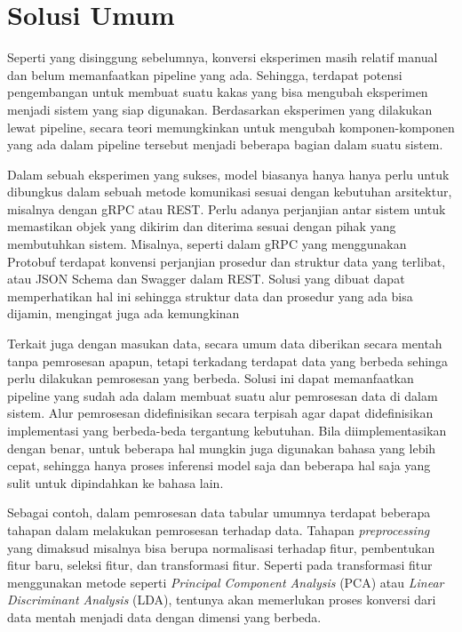 \section{Solusi Umum}

Seperti yang disinggung sebelumnya, konversi eksperimen masih relatif manual dan belum memanfaatkan pipeline yang ada.
Sehingga, terdapat potensi pengembangan untuk membuat suatu kakas yang bisa mengubah eksperimen menjadi sistem yang siap digunakan.
Berdasarkan eksperimen yang dilakukan lewat pipeline, secara teori memungkinkan untuk mengubah komponen-komponen yang ada dalam pipeline tersebut menjadi beberapa bagian dalam suatu sistem.

Dalam sebuah eksperimen yang sukses, model biasanya hanya hanya perlu untuk dibungkus dalam sebuah metode komunikasi sesuai dengan kebutuhan arsitektur, misalnya dengan gRPC atau REST.
Perlu adanya perjanjian antar sistem untuk memastikan objek yang dikirim dan diterima sesuai dengan pihak yang membutuhkan sistem.
Misalnya, seperti dalam gRPC yang menggunakan Protobuf terdapat konvensi perjanjian prosedur dan struktur data yang terlibat, atau JSON Schema dan Swagger dalam REST.
Solusi yang dibuat dapat memperhatikan hal ini sehingga struktur data dan prosedur yang ada bisa dijamin, mengingat juga ada kemungkinan 

Terkait juga dengan masukan data, secara umum data diberikan secara mentah tanpa pemrosesan apapun, tetapi terkadang terdapat data yang berbeda sehinga perlu dilakukan pemrosesan yang berbeda.
Solusi ini dapat memanfaatkan pipeline yang sudah ada dalam membuat suatu alur pemrosesan data di dalam sistem.
Alur pemrosesan didefinisikan secara terpisah agar dapat didefinisikan implementasi yang berbeda-beda tergantung kebutuhan.
Bila diimplementasikan dengan benar, untuk beberapa hal mungkin juga digunakan bahasa yang lebih cepat, sehingga hanya proses inferensi model saja dan beberapa hal saja yang sulit untuk dipindahkan ke bahasa lain.

Sebagai contoh, dalam pemrosesan data tabular umumnya terdapat beberapa tahapan dalam melakukan pemrosesan terhadap data.
Tahapan \textit{preprocessing} yang dimaksud misalnya bisa berupa normalisasi terhadap fitur, pembentukan fitur baru, seleksi fitur, dan transformasi fitur.
Seperti pada transformasi fitur menggunakan metode seperti \textit{Principal Component Analysis} (PCA) atau \textit{Linear Discriminant Analysis} (LDA), tentunya akan memerlukan proses konversi dari data mentah menjadi data dengan dimensi yang berbeda.

